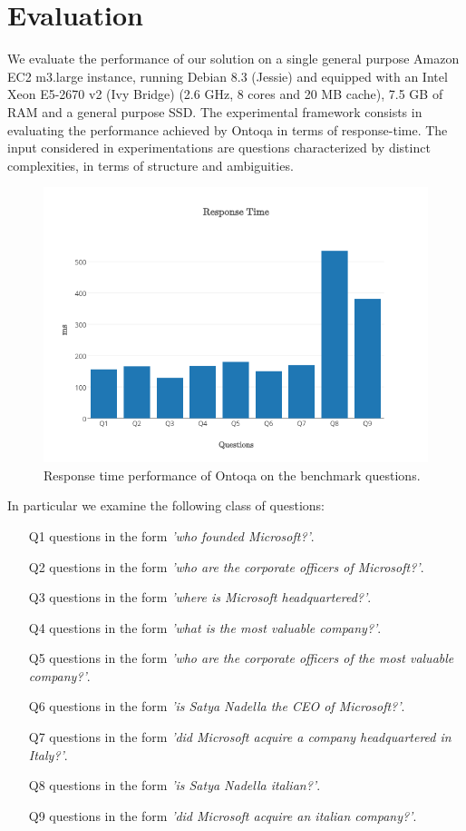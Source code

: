\section{Evaluation}
\label{sec:evaluation}
We evaluate the performance of our solution on a single general purpose
Amazon EC2 m3.large instance, running Debian 8.3 (Jessie)
and equipped with an Intel Xeon E5-2670 v2 (Ivy Bridge)  (2.6 GHz,
8 cores and 20 MB cache), 7.5 GB of RAM and a general purpose SSD.
%
The experimental framework consists in evaluating the performance achieved by Ontoqa in terms of response-time.
%
The input considered in experimentations are questions characterized by distinct complexities, in terms of structure and ambiguities.

\begin{figure}[H]
	\centering
	\includegraphics[width=0.8\columnwidth]{./fig/evaluation-response-time}
	\caption{Response time performance of Ontoqa on the benchmark questions.}
	\label{fig:evaluation-response-time}
\end{figure}

In particular we examine the following class of questions:

\begin{itemize}
	\item[Q1] questions in the form \textit{'who founded Microsoft?'}.
	\item[Q2] questions in the form \textit{'who are the corporate officers of Microsoft?'}.
	\item[Q3] questions in the form \textit{'where is Microsoft headquartered?'}.
	\item[Q4] questions in the form \textit{'what is the most valuable company?'}.
	\item[Q5] questions in the form \textit{'who are the corporate officers of the most valuable company?'}.
	\item[Q6] questions in the form \textit{'is Satya Nadella the CEO of Microsoft?'}.
	\item[Q7] questions in the form \textit{'did Microsoft acquire a company headquartered in Italy?'}.
	\item[Q8] questions in the form \textit{'is Satya Nadella italian?'}.
	\item[Q9] questions in the form \textit{'did Microsoft acquire an italian company?'}.
\end{itemize}

